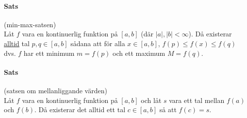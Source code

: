 \paragraph{Sats} (min-max-satsen)\\
Låt $f$ vara en kontinuerlig funktion på $[a,b]$ (där $|a|,|b|<\infty$).
Då existerar \underline{alltid} tal $p,q\in[a,b]$ sådana att för alla $x\in[a,b]$, $f(p)\leq f(x)\leq f(q)$ dvs. $f$ har ett minimum $m=f(p)$ och ett maximum $M=f(q)$.

\paragraph{Sats} (satsen om mellanliggande värden)\\
Låt $f$ vara en kontinuerlig funktion på $[a,b]$ och låt $s$ vara ett tal mellan $f(a)$ och $f(b)$.
Då existerar det alltid ett tal $c\in[a,b]$ så att $f(c)=s$.

